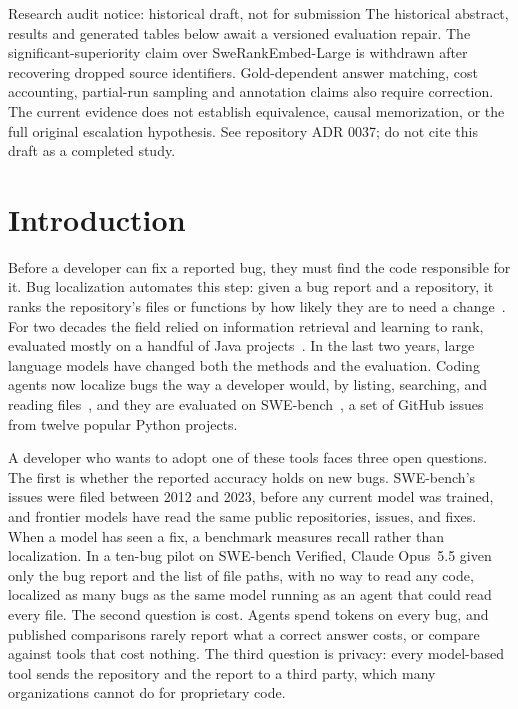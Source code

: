 \documentclass[acmsmall,screen,review,anonymous]{acmart}
\begin{document}

\maketitle

\begin{finding}{Research audit notice: historical draft, not for submission}
The historical abstract, results and generated tables below await a versioned evaluation
repair. The significant-superiority claim over SweRankEmbed-Large is withdrawn after
recovering dropped source identifiers. Gold-dependent answer matching, cost accounting,
partial-run sampling and annotation claims also require correction. The current evidence
does not establish equivalence, causal memorization, or the full original escalation
hypothesis. See repository ADR 0037; do not cite this draft as a completed study.
\end{finding}

\section{Introduction}
\label{sec:intro}

Before a developer can fix a reported bug, they must find the code responsible for it. Bug localization automates this step: given a bug report and a repository, it ranks the repository's files or functions by how likely they are to need a change~\cite{zhou2012buglocator,saha2013bluir,ye2014learning}. For two decades the field relied on information retrieval and learning to rank, evaluated mostly on a handful of Java projects~\cite{lee2018bench4bl}. In the last two years, large language models have changed both the methods and the evaluation. Coding agents now localize bugs the way a developer would, by listing, searching, and reading files~\cite{yang2024sweagent,xia2024agentless,chen2025locagent}, and they are evaluated on SWE-bench~\cite{jimenez2024swebench}, a set of GitHub issues from twelve popular Python projects.

A developer who wants to adopt one of these tools faces three open questions. The first is whether the reported accuracy holds on new bugs. SWE-bench's issues were filed between 2012 and 2023, before any current model was trained, and frontier models have read the same public repositories, issues, and fixes. When a model has seen a fix, a benchmark measures recall rather than localization. In a ten-bug pilot on SWE-bench Verified, Claude Opus~5.5 given only the bug report and the list of file paths, with no way to read any code, localized as many bugs as the same model running as an agent that could read every file. The second question is cost. Agents spend tokens on every bug, and published comparisons rarely report what a correct answer costs, or compare against tools that cost nothing. The third question is privacy: every model-based tool sends the repository and the report to a third party, which many organizations cannot do for proprietary code.
\end{document}

